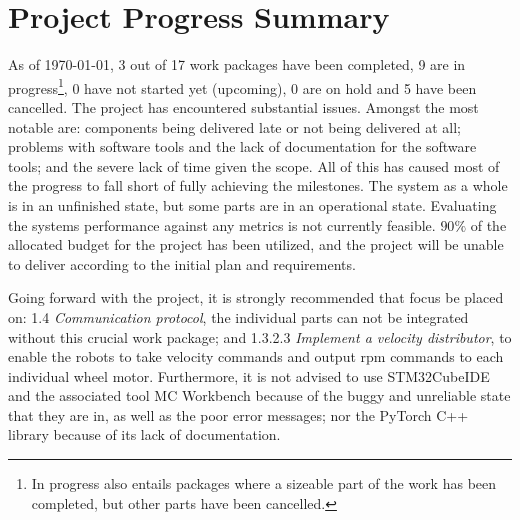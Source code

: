 \section{Project Progress Summary}






As of \today, 3 out of 17 work packages have been completed, 9 are in progress\footnote{In progress also entails packages where a sizeable part of the work has been completed, but other parts have been cancelled.}, 0 have not started yet (upcoming), 0 are on hold and 5 have been cancelled. 
The project has encountered substantial issues. Amongst the most notable are: components being delivered late or not being delivered at all; problems with software tools and the lack of documentation for the software tools; and the severe lack of time given the scope. All of this has caused most of the progress to fall short of fully achieving the milestones.
The system as a whole is in an unfinished state, but some parts are in an operational state. Evaluating the systems performance against any metrics is not currently feasible. $90\%$ of the allocated budget for the project has been utilized, and the project will be unable to deliver according to the initial plan and requirements.

Going forward with the project, it is strongly recommended that focus be placed on: 1.4 \textit{Communication protocol}, the individual parts can not be integrated without this crucial work package; and 1.3.2.3 \textit{Implement a velocity distributor}, to enable the robots to take velocity commands and output \ac{rpm} commands to each individual wheel motor.
Furthermore, it is not advised to use STM32CubeIDE and the associated tool MC Workbench because of the buggy and unreliable state that they are in, as well as the poor error messages; nor the PyTorch C++ library because of its lack of documentation.


\begin{comment}

\end{comment}

